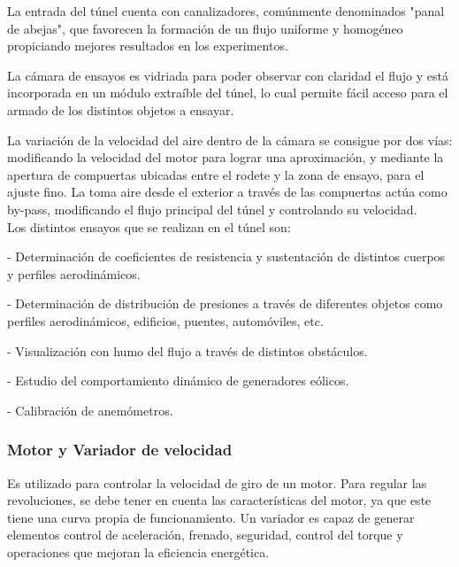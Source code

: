 	La entrada del túnel cuenta con canalizadores, comúnmente denominados "panal de abejas", que favorecen la formación de un flujo uniforme y homogéneo propiciando mejores resultados en los experimentos.
	
	La cámara de ensayos es vidriada para poder observar con claridad el flujo y está incorporada en un módulo extraíble del túnel, lo cual permite fácil acceso para el armado de los distintos objetos a ensayar.
	
	La variación de la velocidad del aire dentro de la cámara se consigue por dos vías: modificando la velocidad del motor para lograr una aproximación, y mediante la apertura de compuertas ubicadas entre el rodete y la zona de ensayo, para el ajuste fino. La toma aire desde el exterior a través de las compuertas actúa como by-pass, modificando el flujo principal del túnel y controlando su velocidad.
	\\
	Los distintos ensayos que se realizan en el túnel son:
	
	- Determinación de coeficientes de resistencia y sustentación de distintos cuerpos y perfiles aerodinámicos. 
	
	- Determinación de distribución de presiones a través de diferentes objetos como perfiles aerodinámicos, edificios, puentes, automóviles, etc.
	
	- Visualización con humo del flujo a través de distintos obstáculos. 
	
	- Estudio del comportamiento dinámico de generadores eólicos. 
	
	- Calibración de anemómetros. 
	
	
		\subsubsection{Motor y Variador de velocidad}
		\begin{tcolorbox}[colback=blue!5!white,colframe=blue!75!black,title=Variador de velocidad]
			Es utilizado para controlar la velocidad de giro de un motor. Para regular las revoluciones, se debe tener en cuenta las características del motor, ya que este tiene  una  curva  propia  de  funcionamiento.  Un  variador  es  capaz  de  generar elementos  control  de  aceleración,  frenado,  seguridad,  control  del  torque  y operaciones que mejoran la eficiencia energética.\end{tcolorbox}	

